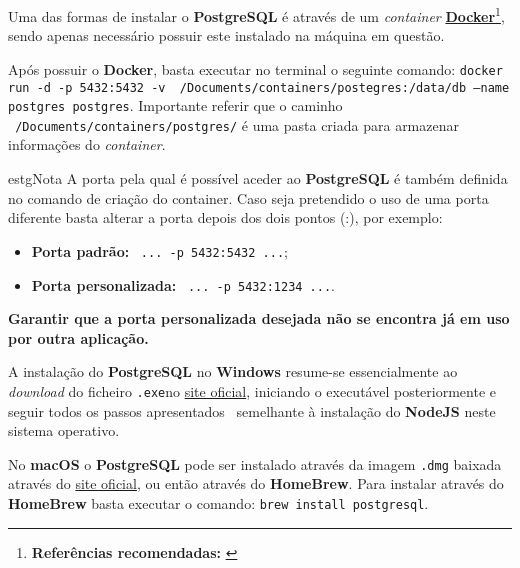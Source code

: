 \label{postgreSQLAttachments}


Uma das formas de instalar o \textbf{PostgreSQL} é através de um \textit{container} \textbf{\href{https://www.docker.com/}{Docker}}\footnote{\textbf{Referências recomendadas:} \cite{postgresDocker,postgresContainer}}, sendo apenas necessário possuir este instalado na máquina em questão.

Após possuir o \textbf{Docker}, basta executar no terminal o seguinte comando: \texttt{docker run -d -p 5432:5432 -v ~/Documents/containers/postegres:/data/db --name postgres postgres}. Importante referir que o caminho \texttt{~/Documents/containers/postgres/} é uma pasta criada para armazenar informações do \textit{container}.

\begin{mybox}{estg}{Nota}
	A porta pela qual é possível aceder ao \textbf{PostgreSQL} é também definida no comando de criação do container. Caso seja pretendido o uso de uma porta diferente basta alterar a porta depois dos dois pontos (:), por exemplo:

	\begin{itemize}
		\item \textbf{Porta padrão:} ~\texttt{... -p 5432:5432 ...};
		\item \textbf{Porta personalizada:} ~\texttt{... -p 5432:1234 ...}.
	\end{itemize}

	\hspace{15pt}

	\textbf{Garantir que a porta personalizada desejada não se encontra já em uso por outra aplicação.}
\end{mybox}


A instalação do \textbf{PostgreSQL} no \textbf{Windows} resume-se essencialmente ao \textit{download} do ficheiro \verb|.exe|no \href{https://www.postgresql.org/download/}{site oficial}, iniciando o executável posteriormente e seguir todos os passos apresentados {\small~semelhante à instalação do \textbf{NodeJS} neste sistema operativo}.


No \textbf{macOS} o \textbf{PostgreSQL} pode ser instalado através da imagem \verb|.dmg| baixada através do \href{https://www.postgresql.org/download/}{site oficial}, ou então através do \textbf{HomeBrew}. Para instalar através do \textbf{HomeBrew} basta executar o comando: \verb|brew install postgresql|.

